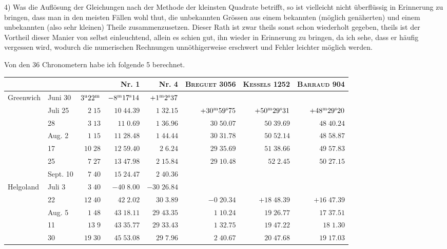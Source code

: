 4) Was die Auflösung der Gleichungen nach der Methode der kleinsten Quadrate betrifft, so ist
vielleicht nicht überflüssig in Erinnerung zu bringen, dass man in den meisten Fällen wohl thut, die
unbekannten Grössen aus einem bekannten (möglich genäherten) und einem unbekannten (also sehr
kleinen) Theile zusammenzusetzen. Dieser Rath ist zwar theils sonst schon wiederholt gegeben, theils
ist der Vortheil dieser Manier von selbst einleuchtend, allein es schien gut, ihn wieder in Erinnerung
zu bringen, da ich sehe, dass er häufig vergessen wird, wodurch die numerischen Rechnungen unnöthigerweise erschwert und Fehler leichter möglich werden.

Von den 36 Chronometern habe ich folgende 5 berechnet.

\begin{center}
\begingroup\fontsize{8}{10}\selectfont\setlength{\tabcolsep}{2pt}
\begin{tabular}{ll|r|r|r|r|r|r}
 & & & Nr. 1 & Nr. 4 & \textsc{Breguet} 3056 & \textsc{Kessels} 1252 & \textsc{Barraud} 904 \\
\hline
Greenwich & Juni 30 & $3^{\rm u}22^{\rm m}$ & $-8^{\rm m}17^{\rm s}14$ & $+1^{\rm m}2^{\rm s}37$ &  &  &  \\
 & Juli 25 & $2\;15$ & $10\;44.39$ & $1\;32.15$ & $+30^{\rm m}59^{\rm s}75$ & $+50^{\rm m}29^{\rm s}31$ & $+48^{\rm m}29^{\rm s}20$ \\
 & 28 & $3\;13$ & $11\;0.69$ & $1\;36.96$ & $30\;50.07$ & $50\;39.69$ & $48\;40.24$ \\
 & Aug. 2 & $1\;15$ & $11\;28.48$ & $1\;44.44$ & $30\;31.78$ & $50\;52.14$ & $48\;58.87$ \\
 & 17 & $10\;28$ & $12\;59.40$ & $2\;6.24$ & $29\;35.69$ & $51\;38.66$ & $49\;57.83$ \\
 & 25 & $7\;27$ & $13\;47.98$ & $2\;15.84$ & $29\;10.48$ & $52\;2.45$ & $50\;27.15$ \\
 & Sept. 10 & $7\;40$ & $15\;24.47$ & $2\;40.36$ &  &  &  \\
Helgoland & Juli 3 & $3\;40$ & $-40\;8.00$ & $-30\;26.84$ &  &  &  \\
 & 22 & $12\;40$ & $42\;2.02$ & $30\;3.89$ & $-0\;20.34$ & $+18\;48.39$ & $+16\;47.39$ \\
 & Aug. 5 & $1\;48$ & $43\;18.11$ & $29\;43.35$ & $1\;10.24$ & $19\;26.77$ & $17\;37.51$ \\
 & 11 & $13\;9$ & $43\;35.77$ & $29\;33.43$ & $1\;32.75$ & $19\;47.22$ & $18\;1.30$ \\
 & 30 & $19\;30$ & $45\;53.08$ & $29\;7.96$ & $2\;40.67$ & $20\;47.68$ & $19\;17.03$ \\

\end{tabular}
\end{center}
